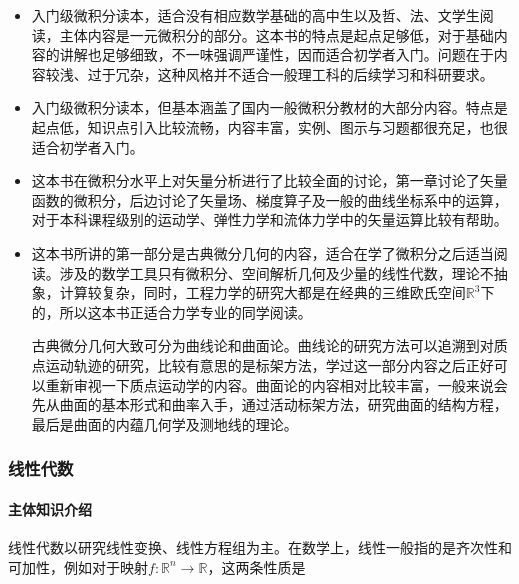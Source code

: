 \begin{itemize}
	\item \cite[普林斯顿微积分读本]{杨爽2010普林斯顿微积分读本}

	      入门级微积分读本，适合没有相应数学基础的高中生以及哲、法、文学生阅读，主体内容是一元微积分的部分。这本书的特点是起点足够低，对于基础内容的讲解也足够细致，不一味强调严谨性，因而适合初学者入门。问题在于内容较浅、过于冗杂，这种风格并不适合一般理工科的后续学习和科研要求。

	\item \cite[托马斯大学微积分]{李伯民2009托马斯大学微积分}

	      入门级微积分读本，但基本涵盖了国内一般微积分教材的大部分内容。特点是起点低，知识点引入比较流畅，内容丰富，实例、图示与习题都很充足，也很适合初学者入门。

	\item \cite[工程数学——矢量分析与场论]{谢树艺2015工程数学}

	      这本书在微积分水平上对矢量分析进行了比较全面的讨论，第一章讨论了矢量函数的微积分，后边讨论了矢量场、梯度算子及一般的曲线坐标系中的运算，对于本科课程级别的运动学、弹性力学和流体力学中的矢量运算比较有帮助。

	\item \cite[微分几何]{彭家贵2002微分几何}

	      这本书所讲的第一部分是古典微分几何的内容，适合在学了微积分之后适当阅读。涉及的数学工具只有微积分、空间解析几何及少量的线性代数，理论不抽象，计算较复杂，同时，工程力学的研究大都是在经典的三维欧氏空间$\mathbb{R}^3$下的，所以这本书正适合力学专业的同学阅读。

	      古典微分几何大致可分为曲线论和曲面论。曲线论的研究方法可以追溯到对质点运动轨迹的研究，比较有意思的是标架方法，学过这一部分内容之后正好可以重新审视一下质点运动学的内容。曲面论的内容相对比较丰富，一般来说会先从曲面的基本形式和曲率入手，通过活动标架方法，研究曲面的结构方程，最后是曲面的内蕴几何学及测地线的理论。
\end{itemize}
\subsubsection{线性代数}

\paragraph{主体知识介绍}

线性代数以研究线性变换、线性方程组为主。在数学上，线性一般指的是齐次性和可加性，例如对于映射$f:\mathbb{R}^n\to\mathbb{R}$，这两条性质是

